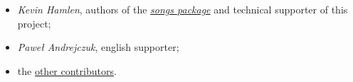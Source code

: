 \begin{itemize}
	\item {\textit{\rmfamily Kevin Hamlen}}, authors of the \href{http://songs.sourceforge.net/}{\textit{songs package}} and technical supporter of this project;
	\item {\textit{\rmfamily Paweł Andrejczuk}}, english supporter;
  \item the \href{https://github.com/PietroPrandini/GuitarHub/graphs/contributors}{other contributors}.
\end{itemize}
